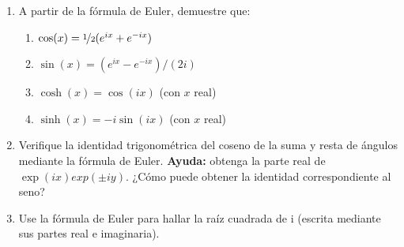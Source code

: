 \documentclass[11pt,spanish]{article}
\begin{document}
\begin{enumerate}

    \item A partir de la fórmula de Euler, demuestre que:
    
    \begin{enumerate}
        \item $\cos(x) = \nicefrac{1}{2}(e^{ix} + e^{-ix})$
        \item $\sin(x) = (e^{ix} - e^{-ix}) / (2i)$
        \item $\cosh(x) = \cos(ix)$ (con $x$ real)
        \item $\sinh(x) = -i \sin(ix)$ (con $x$ real)
    \end{enumerate}
    

    \item Verifique la identidad trigonométrica del coseno de la suma y resta de ángulos mediante la fórmula de Euler.     \textbf{Ayuda:} obtenga la parte real de $\exp(ix)exp(\pm iy)$. ¿Cómo puede obtener la identidad correspondiente al seno?


    \item Use la fórmula de Euler para hallar la raíz cuadrada de i (escrita mediante sus partes real e imaginaria).

\end{enumerate}
\end{document}
